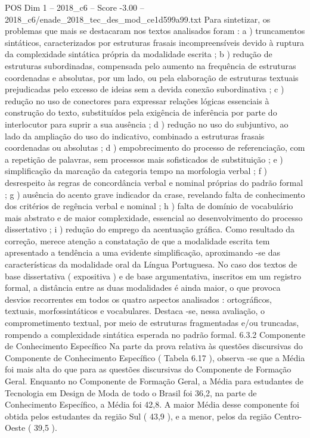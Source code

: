 \begin{textsample}{POS Dim 1 – 2018\_c6 – Score -3.00 – 2018\_c6/enade\_2018\_tec\_des\_mod\_ce1d599a99.txt}
Para sintetizar, os problemas que mais se destacaram nos textos analisados foram : a ) truncamentos sintáticos, caracterizados por estruturas frasais incompreensíveis devido à ruptura da complexidade sintática própria da modalidade escrita ; b ) redução de estruturas subordinadas, compensada pelo aumento na frequência de estruturas coordenadas e absolutas, por um lado, ou pela elaboração de estruturas textuais prejudicadas pelo excesso de ideias sem a devida conexão subordinativa ; c ) redução no uso de conectores para expressar relações lógicas essenciais à construção do texto, substituídos pela exigência de inferência por parte do interlocutor para suprir a sua ausência ; d ) redução no uso do subjuntivo, ao lado da ampliação do uso do indicativo, combinado a estruturas frasais coordenadas ou absolutas ; d ) empobrecimento do processo de referenciação, com a repetição de palavras, sem processos mais sofisticados de substituição ; e ) simplificação da marcação da categoria tempo na morfologia verbal ; f ) desrespeito às regras de concordância verbal e nominal próprias do padrão formal ; g ) ausência do acento grave indicador da crase, revelando falta de conhecimento dos critérios de regência verbal e nominal ; h ) falta de domínio de vocabulário mais abstrato e de maior complexidade, essencial ao desenvolvimento do processo dissertativo ; i ) redução do emprego da acentuação gráfica.
Como resultado da correção, merece atenção a constatação de que a modalidade escrita tem apresentado a tendência a uma evidente simplificação, aproximando -se das características da modalidade oral da Língua Portuguesa.
No caso dos textos de base dissertativa ( expositiva ) e de base argumentativa, inscritos em um registro formal, a distância entre as duas modalidades é ainda maior, o que provoca desvios recorrentes em todos os quatro aspectos analisados : ortográficos, textuais, morfossintáticos e vocabulares.
Destaca -se, nessa avaliação, o comprometimento textual, por meio de estruturas fragmentadas e/ou truncadas, rompendo a complexidade sintática esperada no padrão formal. 6.3.2 Componente de Conhecimento Específico Na parte da prova relativa às questões discursivas do Componente de Conhecimento Específico ( Tabela 6.17 ), observa -se que a Média foi mais alta do que para as questões discursivas do Componente de Formação Geral.
Enquanto no Componente de Formação Geral, a Média para estudantes de Tecnologia em Design de Moda de todo o Brasil foi 36,2, na parte de Conhecimento Específico, a Média foi 42,8.
A maior Média desse componente foi obtida pelos estudantes da região Sul ( 43,9 ), e a menor, pelos da região Centro-Oeste ( 39,5 ).

\end{textsample}
